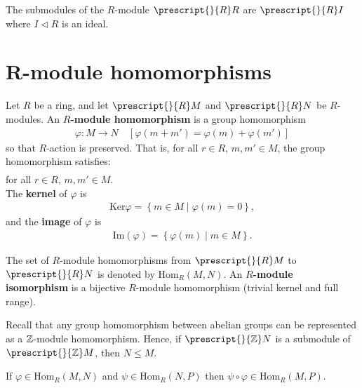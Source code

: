 \documentclass{memoir}
\begin{document}
\begin{hw}
	The submodules of the \(R\)-module \(\prescript{}{R}R\) are \(\prescript{}{R}I\) where \(I \triangleleft R\) is an ideal.
\end{hw}

\section{R-module homomorphisms}
\label{sec:r_module_homomorphisms}

\begin{defn}
	Let \(R\) be a ring, and let \(\prescript{}{R}M\) and \(\prescript{}{R}N\) be \(R\)-modules. An \textbf{\(R\)-module homomorphism} is a group homomorphism
	\begin{align*}
		\varphi:M\to N \quad [\varphi(m+m') = \varphi(m) + \varphi(m')]
	\end{align*}
	so that \(R\)-action is preserved. That is, for all \(r \in R\), \(m,m' \in M\), the group homomorphism satisfies:
	\begin{align*}
		[\varphi(rm) = r\varphi(m)]
	\end{align*}
	for all \(r \in R\), \(m,m' \in M\).\\

The \textbf{kernel} of \(\varphi\) is 
\begin{align*}
\textrm{Ker}\varphi = \left\{m \in M \mid \varphi(m) = 0 \right\},
\end{align*}
 and the \textbf{image} of \(\varphi\) is 
\begin{align*}
	\textrm{Im}(\varphi) = \left\{\varphi(m) \mid m \in M \right\} .
\end{align*}
\end{defn}
The set of \(R\)-module homomorphisms from \(\prescript{}{R}M\) to \(\prescript{}{R}N\) is denoted by \( \textrm{Hom}_R(M,N)\). An \textbf{\(R\)-module isomorphism} is a bijective \(R\)-module homomorphism (trivial kernel and full range).\\

\begin{exmp}[\(\Z\)-submodules]
	
Recall that any group homomorphism between abelian groups can be represented as a \(\Z\)-module homomorphism. Hence, if \(\prescript{}{\Z}N\) is a submodule of \(\prescript{}{\Z}M\), then \(N\leq M\).
\end{exmp}

\begin{hw}
	If \(\varphi \in \textrm{Hom}_R(M,N)\) and \(\psi \in \textrm{Hom}_R(N,P)\) then \(\psi \circ \varphi \in \textrm{Hom}_R(M,P)\).
\end{hw}
\end{document}
